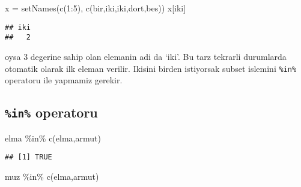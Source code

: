 \documentclass[
]{book}
\newenvironment{Shaded}{\begin{snugshade}}{\end{snugshade}}
\newcommand{\DecValTok}[1]{\textcolor[rgb]{0.00,0.00,0.81}{#1}}
\newcommand{\FunctionTok}[1]{\textcolor[rgb]{0.00,0.00,0.00}{#1}}
\newcommand{\NormalTok}[1]{#1}
\newcommand{\OtherTok}[1]{\textcolor[rgb]{0.56,0.35,0.01}{#1}}
\newcommand{\SpecialCharTok}[1]{\textcolor[rgb]{0.00,0.00,0.00}{#1}}
\newcommand{\StringTok}[1]{\textcolor[rgb]{0.31,0.60,0.02}{#1}}
\begin{document}
\begin{Shaded}
\begin{Highlighting}[]
\NormalTok{x }\OtherTok{=} \FunctionTok{setNames}\NormalTok{(}\FunctionTok{c}\NormalTok{(}\DecValTok{1}\SpecialCharTok{:}\DecValTok{5}\NormalTok{), }\FunctionTok{c}\NormalTok{(}\StringTok{\textquotesingle{}bir\textquotesingle{}}\NormalTok{,}\StringTok{\textquotesingle{}iki\textquotesingle{}}\NormalTok{,}\StringTok{\textquotesingle{}iki\textquotesingle{}}\NormalTok{,}\StringTok{\textquotesingle{}dort\textquotesingle{}}\NormalTok{,}\StringTok{\textquotesingle{}bes\textquotesingle{}}\NormalTok{))}
\NormalTok{x[}\StringTok{\textquotesingle{}iki\textquotesingle{}}\NormalTok{]}
\end{Highlighting}
\end{Shaded}

\begin{verbatim}
## iki 
##   2
\end{verbatim}

oysa 3 degerine sahip olan elemanin adi da `iki'. Bu tarz tekrarli durumlarda otomatik olarak ilk eleman verilir. Ikisini birden istiyorsak subset islemini \texttt{\%in\%} operatoru ile yapmamiz gerekir.

\hypertarget{in-operatoru}{%
\subsection{\texorpdfstring{\texttt{\%in\%} operatoru}{\%in\% operatoru}}\label{in-operatoru}}

\begin{Shaded}
\begin{Highlighting}[]
\StringTok{\textquotesingle{}elma\textquotesingle{}} \SpecialCharTok{\%in\%} \FunctionTok{c}\NormalTok{(}\StringTok{\textquotesingle{}elma\textquotesingle{}}\NormalTok{,}\StringTok{\textquotesingle{}armut\textquotesingle{}}\NormalTok{)}
\end{Highlighting}
\end{Shaded}

\begin{verbatim}
## [1] TRUE
\end{verbatim}

\begin{Shaded}
\begin{Highlighting}[]
\StringTok{\textquotesingle{}muz\textquotesingle{}} \SpecialCharTok{\%in\%} \FunctionTok{c}\NormalTok{(}\StringTok{\textquotesingle{}elma\textquotesingle{}}\NormalTok{,}\StringTok{\textquotesingle{}armut\textquotesingle{}}\NormalTok{)}
\end{Highlighting}
\end{Shaded}
\end{document}
